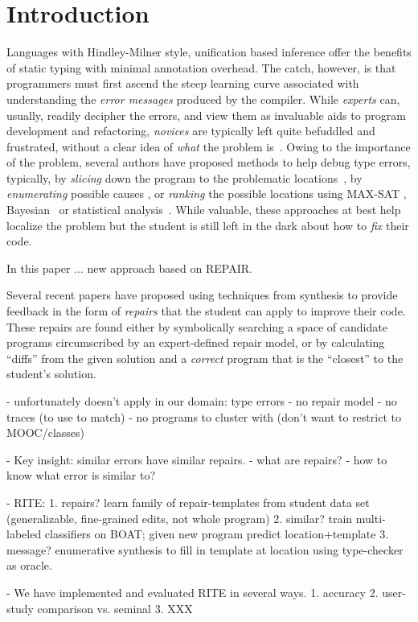 \section{Introduction}
\label{sec:intro}

%
Languages with Hindley-Milner style, unification based inference 
offer the benefits of static typing with minimal annotation overhead.
The catch, however, is that programmers must first ascend the steep 
learning curve associated with understanding the \emph{error messages} 
produced by the compiler. 
%
While \emph{experts} can, usually, readily decipher the errors, and 
view them as invaluable aids to program development and refactoring,
\emph{novices} are typically left quite befuddled and frustrated, 
without a clear idea of \emph{what} the problem is~\cite{Wand1986-nw}.
%
Owing to the importance of the problem, several authors 
have proposed methods to help debug type errors, typically, 
by \emph{slicing} down the program to the problematic locations~\cite{Haack2003-vc, Rahli2015-tt}, 
by \emph{enumerating} possible causes \cite{Lerner2007-dt, Chen2014-gd},
or \emph{ranking} the possible locations using MAX-SAT 
\cite{Pavlinovic2014-mr}, Bayesian~\cite{Zhang2014-lv} 
or statistical analysis~\cite{Seidel:2017}.
%
While valuable, these approaches at best help localize 
the problem but the student is still left in the dark 
about how to \emph{fix} their code.


In this paper ... new approach based on REPAIR.

Several recent papers have proposed using techniques from synthesis 
to provide feedback in the form of \emph{repairs} that the student 
can apply to improve their code. These repairs are found either by 
symbolically searching a space of candidate programs circumscribed 
by an expert-defined repair model, or by calculating ``diffs'' from 
the given solution and a \emph{correct} program that is the ``closest'' 
to the student's solution.

- unfortunately doesn't apply in our domain: type errors
    - no repair model
    - no traces (to use to match)
    - no programs to cluster with
        (don't want to restrict to MOOC/classes)

- Key insight: similar errors have similar repairs.
    - what are repairs? 
    - how to know what error is similar to? 

- RITE:
    1. repairs? learn family of repair-templates from student data set (generalizable, fine-grained edits, not whole program)
    2. similar? train multi-labeled classifiers on BOAT; given new program predict location+template
    3. message? enumerative synthesis to fill in template at location using type-checker as oracle. 

- We have implemented and evaluated RITE in several ways.
    1. accuracy
    2. user-study comparison vs. seminal
    3. XXX

























